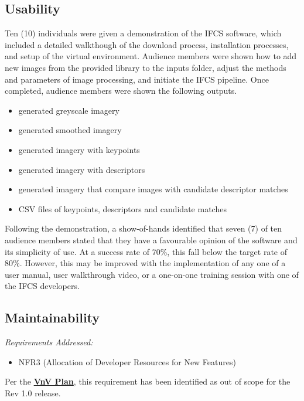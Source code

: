 \documentclass[12pt, titlepage]{article}
\begin{document}
\subsection{Usability}
Ten (10) individuals were given a demonstration of the IFCS software, which included a detailed walkthough of the download process, installation processes, and setup of the virtual environment. Audience members were shown how to add new images from the provided library to the inputs folder, adjust the methods and parameters of image processing, and initiate the IFCS pipeline. Once completed, audience members were shown the following outputs.
\begin{itemize}
  \item generated greyscale imagery
  \item generated smoothed imagery
  \item generated imagery with keypoints
  \item generated imagery with descriptors
  \item generated imagery that compare images with candidate descriptor matches
  \item CSV files of keypoints, descriptors and candidate matches
\end{itemize}
Following the demonstration, a show-of-hands identified that seven (7) of ten audience members stated that they have a favourable opinion of the software and its simplicity of use. At a success rate of 70\%, this fall below the target rate of 80\%. However, this may be improved with the implementation of any one of a user manual, user walkthrough video, or a one-on-one training session with one of the IFCS developers.

\subsection{Maintainability}
\textit{Requirements Addressed:} 
\begin{itemize}
\item NFR3 (Allocation of Developer Resources for New Features)
\end{itemize}
Per the \href{https://github.com/KiranSingh15/CAS-741-Image-Correspondences/blob/main/docs/VnVPlan/VnVPlan.pdf}{\textbf{VnV Plan}}, this requirement has been identified as out of scope for the Rev 1.0 release.
		
\end{document}

